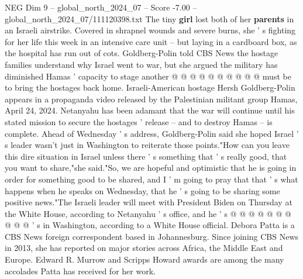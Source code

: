 \begin{textsample}{NEG Dim 9 – global\_north\_2024\_07 – Score -7.00 – global\_north\_2024\_07/111120398.txt}
The tiny \textbf{girl} lost both of her \textbf{parents} in an Israeli airstrike.
Covered in shrapnel wounds and severe burns, she ' s fighting for her life this week in an intensive care unit -- but laying in a cardboard box, as the hospital has run out of cots.
Goldberg-Polin told CBS News the hostage families understand why Israel went to war, but she argued the military has diminished Hamas ' capacity to stage another @ @ @ @ @ @ @ @ @ @ must be to bring the hostages back home.
Israeli-American hostage Hersh Goldberg-Polin appears in a propaganda video released by the Palestinian militant group Hamas, April 24, 2024.
Netanyahu has been adamant that the war will continue until his stated mission to secure the hostages ' release -- and to destroy Hamas -- is complete.
Ahead of Wednesday ' s address, Goldberg-Polin said she hoped Israel ' s leader wasn't just in Washington to reiterate those points."How can you leave this dire situation in Israel unless there ' s something that ' s really good, that you want to share,"she said."So, we are hopeful and optimistic that he is going in order for something good to be shared, and I ' m going to pray that that ' s what happens when he speaks on Wednesday, that he ' s going to be sharing some positive news."The Israeli leader will meet with President Biden on Thursday at the White House, according to Netanyahu ' s office, and he ' s @ @ @ @ @ @ @ @ @ @ ' s in Washington, according to a White House official.
Debora Patta is a CBS News foreign correspondent based in Johannesburg.
Since joining CBS News in 2013, she has reported on major stories across Africa, the Middle East and Europe.
Edward R.
Murrow and Scripps Howard awards are among the many accolades Patta has received for her work.

\end{textsample}
